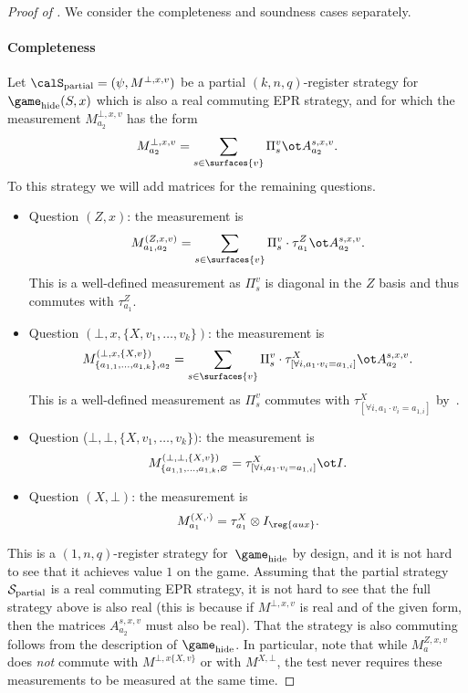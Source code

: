 \begin{proof}[Proof of ]
  We consider the completeness and soundness cases separately.
  \paragraph{Completeness}
  Let $\calS_{\mathrm{partial}} = (\psi, M^{\bot, x,v})$ be a partial
  $(k,n,q)$-register strategy for~$\game_{\mathrm{hide}}(S,x)$ which is also a real commuting EPR strategy, and for which
  the measurement $M^{\bot, x,v}_{a_2}$ has the form
  \[ M^{\bot, x,v}_{a_2} = \sum_{s \in \surfaces{v}} \Pi^{v}_s \ot A^{s,x,v}_{a_2} . \]
  To this strategy we will add matrices for the remaining questions.
  \begin{itemize}
  \item[$\circ$] Question $(Z, x)$: the measurement is
    \[ M^{(Z,x,v)}_{a_1, a_2} = \sum_{s \in \surfaces{v}} \Pi^{v}_s \cdot
      \tau^{Z}_{a_1} \ot A^{s,x,v}_{a_2}. \]
    This is a well-defined measurement as $\Pi^{v}_s$ is diagonal in the
    $Z$ basis and thus commutes with $\tau^Z_{a_1}$.
  \item[$\circ$] Question $(\bot, x, \{X, v_1, \dots, v_k\})$: the
    measurement is
    \[ M^{(\bot, x, \{X, v\})}_{\{a_{1,1}, \dots,
        a_{1,k}\}, a_2} = \sum_{s \in \surfaces{v}} \Pi^{v}_s \cdot
      \tau^{X}_{[\forall i, a_1 \cdot v_i = a_{1,i}]}  \ot
      A^{s,x,v}_{a_2}.\]
    This is a well-defined measurement as $\Pi^{v}_s$ commutes with
    $\tau^{X}_{[\forall i, a_1 \cdot v_i = a_{1,i}]}$
    by~.
  \item[$\circ$] Question ($\bot, \bot, \{X, v_1, \dots, v_k\})$: the
    measurement is
    \[ M^{(\bot, \bot, \{X, v\})}_{\{a_{1,1}, \dots, a_{1,k},
        \varnothing} = \tau^X_{[\forall i, a_1 \cdot v_i = a_{1,i}]}
      \ot I. \]
  \item[$\circ$] Question $(X, \bot)$: the measurement is
    \[ M^{(X, \cdot)}_{a_1} = \tau^{X}_{a_1} \otimes I_{\reg{aux}}. \]
  \end{itemize}
This is a $(1,n,q)$-register strategy for~$\game_{\mathrm{hide}}$ by
design, and it is not hard to see that it achieves value $1$ on the
game. Assuming that the partial strategy $\cal{S}_{\mathrm{partial}}$
is a real commuting EPR strategy, it is not hard to see that the full
strategy above is also real (this is because if $M^{\bot, x,v}$ is real and
of the given form, then the matrices $A^{s,x,v}_{a_2}$ must also be
real). That the strategy is also commuting follows from the
description of $\game_{\mathrm{hide}}$. In particular, note that while
$M^{Z,x,v}_a$ does \emph{not} commute with $M^{\bot, x \{X, v\}}$ or
with $M^{X, \bot}$, the test never requires these measurements to be measured at the same time.


\end{proof}

